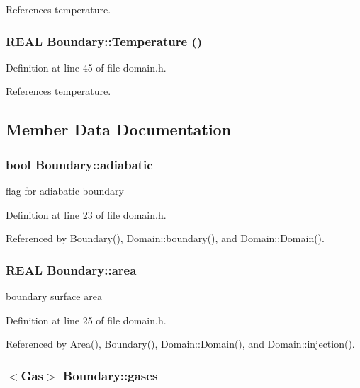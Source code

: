 References temperature.\hypertarget{structBoundary_7b08a692b28e1f4ddb6d503008c92da9}{
\subsubsection[{Temperature}]{\setlength{\rightskip}{0pt plus 5cm}REAL Boundary::Temperature ()}}
\label{structBoundary_7b08a692b28e1f4ddb6d503008c92da9}




Definition at line 45 of file domain.h.

References temperature.

\subsection{Member Data Documentation}
\hypertarget{structBoundary_3d76841cd43b92d657c58ce7eec21248}{
\subsubsection[{adiabatic}]{\setlength{\rightskip}{0pt plus 5cm}bool {\bf Boundary::adiabatic}}}
\label{structBoundary_3d76841cd43b92d657c58ce7eec21248}


flag for adiabatic boundary 



Definition at line 23 of file domain.h.

Referenced by Boundary(), Domain::boundary(), and Domain::Domain().\hypertarget{structBoundary_2ebca8ebf70ee4a9be4ac3beb32d5be6}{
\subsubsection[{area}]{\setlength{\rightskip}{0pt plus 5cm}REAL {\bf Boundary::area}}}
\label{structBoundary_2ebca8ebf70ee4a9be4ac3beb32d5be6}


boundary surface area 



Definition at line 25 of file domain.h.

Referenced by Area(), Boundary(), Domain::Domain(), and Domain::injection().\hypertarget{structBoundary_692b67a420d6ddbf657e642f295ae580}{
\subsubsection[{gases}]{$<$Gas$>$ {\bf Boundary::gases}}}
\label{structBoundary_692b67a420d6ddbf657e642f295ae580}



